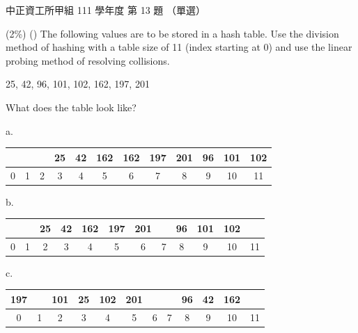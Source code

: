 \begin{pastexam}[label={px:ccu-111-swa-05}]{中正資工所甲組 111 學年度 第 13 題}
（單選）

(2\%) (\quad) The following values are to be stored in a hash table. Use the division method of
hashing with a table size of 11 (index starting at 0) and use the linear probing method of resolving
collisions.
\begin{center}25, 42, 96, 101, 102, 162, 197, 201\end{center}
What does the table look like?

{\small
a.\\
\begin{tabular}{|*{12}{c|}}
\hline
 &  &  & 25 & 42 & 162 & 162 & 197 & 201 & 96 & 101 & 102\\ \hline
\multicolumn{1}{c}{\scriptsize 0} & \multicolumn{1}{c}{\scriptsize 1} & \multicolumn{1}{c}{\scriptsize 2} & \multicolumn{1}{c}{\scriptsize 3} & \multicolumn{1}{c}{\scriptsize 4} & \multicolumn{1}{c}{\scriptsize 5} & \multicolumn{1}{c}{\scriptsize 6} & \multicolumn{1}{c}{\scriptsize 7} & \multicolumn{1}{c}{\scriptsize 8} & \multicolumn{1}{c}{\scriptsize 9} & \multicolumn{1}{c}{\scriptsize 10} & \multicolumn{1}{c}{\scriptsize 11}
\end{tabular}

\smallskip
b.\\
\begin{tabular}{|*{12}{c|}}
\hline
 &  & 25 & 42 & 162 & 197 & 201 &  & 96 & 101 & 102 & \\ \hline
\multicolumn{1}{c}{\scriptsize 0} & \multicolumn{1}{c}{\scriptsize 1} & \multicolumn{1}{c}{\scriptsize 2} & \multicolumn{1}{c}{\scriptsize 3} & \multicolumn{1}{c}{\scriptsize 4} & \multicolumn{1}{c}{\scriptsize 5} & \multicolumn{1}{c}{\scriptsize 6} & \multicolumn{1}{c}{\scriptsize 7} & \multicolumn{1}{c}{\scriptsize 8} & \multicolumn{1}{c}{\scriptsize 9} & \multicolumn{1}{c}{\scriptsize 10} & \multicolumn{1}{c}{\scriptsize 11}
\end{tabular}

\smallskip
c.\\
\begin{tabular}{|*{12}{c|}}
\hline
197 &  & 101 & 25 & 102 & 201 &  &  & 96 & 42 & 162 & \\ \hline
\multicolumn{1}{c}{\scriptsize 0} & \multicolumn{1}{c}{\scriptsize 1} & \multicolumn{1}{c}{\scriptsize 2} & \multicolumn{1}{c}{\scriptsize 3} & \multicolumn{1}{c}{\scriptsize 4} & \multicolumn{1}{c}{\scriptsize 5} & \multicolumn{1}{c}{\scriptsize 6} & \multicolumn{1}{c}{\scriptsize 7} & \multicolumn{1}{c}{\scriptsize 8} & \multicolumn{1}{c}{\scriptsize 9} & \multicolumn{1}{c}{\scriptsize 10} & \multicolumn{1}{c}{\scriptsize 11}
\end{tabular}

}
\end{pastexam}
